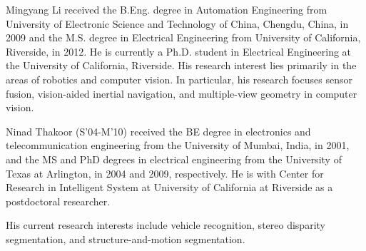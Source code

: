 \documentclass[10pt,journal]{IEEEtran}
\begin{document}
\begin{IEEEbiography}{Mingyang Li} received the B.Eng. degree in Automation Engineering from University of Electronic Science and Technology of China, Chengdu, China, in 2009 and the M.S. degree in
Electrical Engineering from University of California, Riverside, in 2012.
He is currently a Ph.D. student in Electrical Engineering at the University of California, Riverside. His research interest lies primarily in the areas of robotics and computer vision. In particular, his research focuses sensor fusion, vision-aided inertial navigation, and multiple-view geometry in computer vision. 
\end{IEEEbiography}


\begin{IEEEbiography}{Ninad Thakoor} 
(S'04-M'10) received the BE degree in electronics and telecommunication engineering from the University of Mumbai, India, in 2001, and the MS and PhD degrees in electrical engineering from the University of Texas at Arlington, in 2004 and 2009, respectively. He is with Center for Research in Intelligent System at University of California at Riverside as a postdoctoral researcher.

His current research interests include vehicle recognition, stereo disparity segmentation, and structure-and-motion segmentation.
\end{IEEEbiography}
\end{document}

